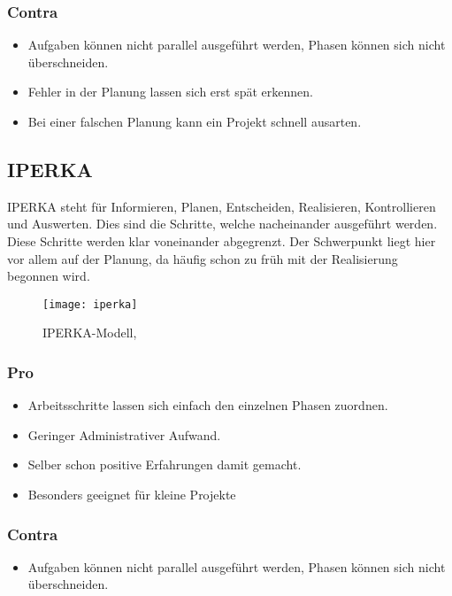 \subsubsection{Contra}
\begin{itemize}
\item Aufgaben können nicht parallel ausgeführt werden, Phasen können sich nicht überschneiden.
\item Fehler in der Planung lassen sich erst spät erkennen.
\item Bei einer falschen Planung kann ein Projekt schnell ausarten. 
\end{itemize}
\subsection{IPERKA}
IPERKA steht für Informieren, Planen, Entscheiden, Realisieren, Kontrollieren und Auswerten. Dies sind die Schritte, welche nacheinander ausgeführt werden. Diese Schritte werden klar voneinander abgegrenzt. Der Schwerpunkt liegt hier vor allem auf der Planung, da häufig schon zu früh mit der Realisierung begonnen wird.
\begin{figure}[H]
	\centering
	\texttt{[image: iperka]}
	\caption{IPERKA-Modell, \protect{}}
\end{figure}
\subsubsection{Pro}
\begin{itemize}
\item Arbeitsschritte lassen sich einfach den einzelnen Phasen zuordnen.
\item Geringer Administrativer Aufwand.
\item Selber schon positive Erfahrungen damit gemacht.
\item Besonders geeignet für kleine Projekte
\end{itemize}
\subsubsection{Contra}
\begin{itemize}
\item Aufgaben können nicht parallel ausgeführt werden, Phasen können sich nicht überschneiden. 
\end{itemize}

